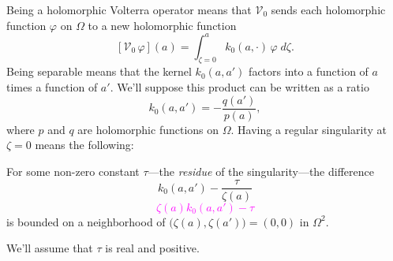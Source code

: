 \documentclass{article}
\makeatletter
\theoremstyle{plain}
\newcommand{\condconst}[2]{\item[($\text{\textsc{#1}} \mid #2$)]\protected@edef\@currentlabel{$\text{\textsc{#1}} \mid #2$}}
\newcommand{\hardpart}{\mathcal{V}_0}
\newcommand{\hardker}{k_0}
\newcommand{\domain}{\Omega}
\makeatother
\begin{document}
Being a holomorphic Volterra operator means that $\hardpart$ sends each holomorphic function $\varphi$ on $\domain$ to a new holomorphic function
\[ [\hardpart\,\varphi](a) = \int_{\zeta = 0}^a \hardker(a, \cdot)\,\varphi\;d\zeta. \]
Being separable means that the kernel $\hardker(a, a')$ factors into a function of $a$ times a function of $a'$. We'll suppose this product can be written as a ratio
\[ \hardker(a, a') = - \frac{q(a')}{p(a)}, \]
where $p$ and $q$ are holomorphic functions on $\domain$. Having a regular singularity at $\zeta = 0$ means the following:
\begin{conditions}
\condconst{sing}{\tau}\label{cond:sing} For some non-zero constant $\tau$---the {\em residue} of the singularity---the difference
\[ \hardker(a, a') - \frac{\tau}{\zeta(a)} \]
\textcolor{magenta}{\[ \zeta(a)\hardker(a, a') - \tau \]}
is bounded on a neighborhood of $\big(\zeta(a), \zeta(a')\big) = (0, 0)$ in $\domain^2$.
\end{conditions}
We'll assume that $\tau$ is real and positive.
\end{document}
